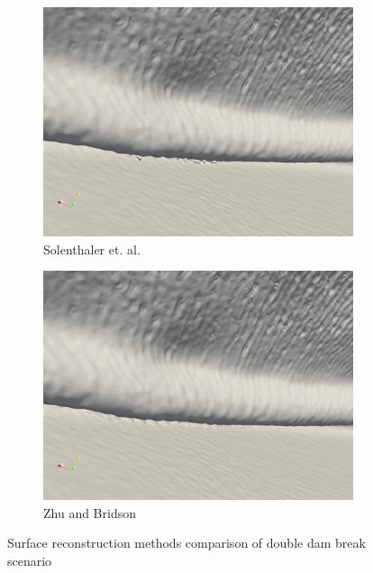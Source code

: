 \begin{figure}
\begin{center}
\begin{subfigure}[b]{0.48\textwidth}
			\includegraphics[width=\textwidth]{figures/SolenthalerEtAlForRelWorkDoubleDamBreak2.png}
			\caption{Solenthaler et. al.}
		\end{subfigure}
		\begin{subfigure}[b]{0.48\textwidth}
			\includegraphics[width=\textwidth]{figures/ZhuBridsonForRelatedWorksDoubleDamBreak2.png}
			\caption{Zhu and Bridson}
		\end{subfigure}

	\end{center}
	\caption{Surface reconstruction methods comparison of double dam break scenario}
	\label{fig:double_dam_break_comparison2}
\end{figure}



